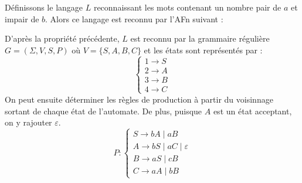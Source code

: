 \begin{example}
    Définissons le langage $L$ reconnaissant les mots contenant un nombre pair de $a$ et impair de $b$. 
    Alors ce langage est reconnu par l'AFn suivant : 
    \begin{center}
    \end{center}
    
    D'après la propriété précédente, $L$ est reconnu par la grammaire régulière $G = (\Sigma, V, S, P)$
    où $V = \{S,A,B,C\}$ et les états sont représentés par :
        \[ 
            \begin{cases}
                1 \longrightarrow S \\ 
                2 \longrightarrow A \\ 
                3 \longrightarrow B \\ 
                4 \longrightarrow C
            \end{cases} \] 
    On peut ensuite déterminer les règles de production à partir du voisinnage sortant 
    de chaque état de l'automate. De plus, puisque $A$ est un état acceptant, on y rajouter $\varepsilon$. 
    \[ P : 
            \begin{cases}
                S \longrightarrow bA \; | \; aB \\ 
                A \longrightarrow bS \; | \; aC \; | \; \varepsilon \\ 
                B \longrightarrow aS \; | \; cB \\ 
                C \longrightarrow aA \; | \; bB 
            \end{cases} \] 
\end{example}


